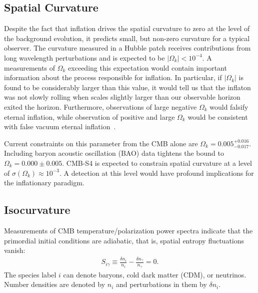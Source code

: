 \subsection{Spatial Curvature}

Despite the fact that inflation drives the spatial curvature to zero at the level of the background evolution, it predicts small, but non-zero curvature for a typical observer. The curvature measured in a Hubble patch receives contributions from long wavelength perturbations and is expected to be $|\Omega_k|<10^{-4}$. A measurements of $\Omega_k$ exceeding this expectation would contain important information about the process responsible for inflation. In particular, if $|\Omega_k|$ is found to be considerably larger than this value, it would tell us that the inflaton was not slowly rolling when scales slightly larger than our observable horizon exited the horizon. Furthermore, observations of large negative $\Omega_k$ would falsify eternal inflation, while observation of positive and large $\Omega_k$ would be consistent with false vacuum eternal inflation~\cite{Guth:2012ww,Kleban:2012ph}.

Current constraints on this parameter from the CMB alone are $\Omega_k= 0.005^{+0.016}_{-0.017}$. Including baryon acoustic oscillation (BAO) data tightens the bound to $\Omega_k=0.000\pm0.005$. CMB-S4 is expected to constrain spatial curvature at a level of $\sigma(\Omega_k)\approx 10^{-3}$. A detection at this level would have profound implications for the inflationary paradigm. 

\subsection{Isocurvature}
Measurements of CMB temperature/polarization power spectra indicate that the primordial initial conditions are adiabatic, that is, spatial entropy fluctuations vanish:
\begin{align}
S_{i \gamma}\equiv \frac{\delta n_{i}}{n_{i}}-\frac{\delta n_{\gamma}}{n_{\gamma}} =0.\end{align} The species label $i$ can denote baryons, cold dark matter (CDM), or neutrinos. Number densities are denoted by $n_{i}$ and perturbations in them by $\delta n_{i}$.

